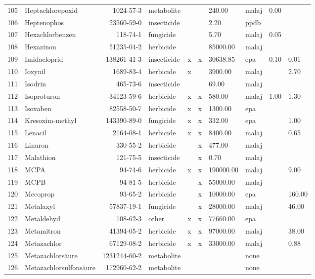 \begin{longtable}{lp{3cm}rlp{0.5cm}p{0.5cm}p{1cm}p{1cm}p{1cm}p{1cm}}
  105 & Heptachlorepoxid & 1024-57-3 & metabolite &  &  & 240.00 & malaj & 0.00 &  \\ 
  106 & Heptenophos & 23560-59-0 & insecticide &  &  & 2.20 & ppdb &  &  \\ 
  107 & Hexachlorbenzen & 118-74-1 & fungicide &  &  & 5.70 & malaj & 0.05 &  \\ 
  108 & Hexazinon & 51235-04-2 & herbicide &  &  & 85000.00 & malaj &  &  \\ 
  109 & Imidacloprid & 138261-41-3 & insecticide & x & x & 30638.85 & epa & 0.10 & 0.01 \\ 
  110 & Ioxynil & 1689-83-4 & herbicide & x &  & 3900.00 & malaj &  & 2.70 \\ 
  111 & Isodrin & 465-73-6 & insecticide &  &  & 69.00 & malaj &  &  \\ 
  112 & Isoproturon & 34123-59-6 & herbicide & x & x & 580.00 & malaj & 1.00 & 1.30 \\ 
  113 & Isoxaben & 82558-50-7 & herbicide & x & x & 1300.00 & epa &  &  \\ 
  114 & Kresoxim-methyl & 143390-89-0 & fungicide & x & x & 332.00 & epa &  & 1.00 \\ 
  115 & Lenacil & 2164-08-1 & herbicide & x & x & 8400.00 & malaj &  & 0.65 \\ 
  116 & Linuron & 330-55-2 & herbicide &  & x & 477.00 & malaj &  &  \\ 
  117 & Malathion & 121-75-5 & insecticide &  & x & 0.70 & malaj &  &  \\ 
  118 & MCPA & 94-74-6 & herbicide & x & x & 190000.00 & malaj &  & 9.00 \\ 
  119 & MCPB & 94-81-5 & herbicide &  & x & 55000.00 & malaj &  &  \\ 
  120 & Mecoprop & 93-65-2 & herbicide &  & x & 10000.00 & epa &  & 160.00 \\ 
  121 & Metalaxyl & 57837-19-1 & fungicide &  & x & 28000.00 & malaj &  & 46.00 \\ 
  122 & Metaldehyd & 108-62-3 & other & x & x & 77660.00 & epa &  &  \\ 
  123 & Metamitron & 41394-05-2 & herbicide & x & x & 97000.00 & malaj &  & 38.00 \\ 
  124 & Metazachlor & 67129-08-2 & herbicide & x & x & 33000.00 & malaj &  & 0.88 \\ 
  125 & Metazachlorsäure & 1231244-60-2 & metabolite &  &  &  & none &  &  \\ 
  126 & Metazachlorsulfonsäure & 172960-62-2 & metabolite &  &  &  & none &  &  \\ 

\end{longtable}
